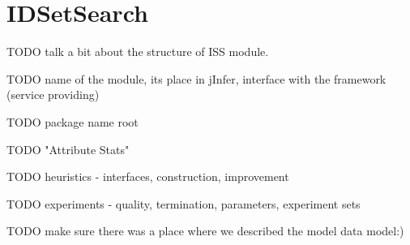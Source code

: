 \chapter{IDSetSearch}
\label{appendix-iss}

TODO talk a bit about the structure of ISS module.

TODO name of the module, its place in jInfer, interface with the framework (service providing)

TODO package name root

TODO "Attribute Stats"

TODO heuristics - interfaces, construction, improvement

TODO experiments - quality, termination, parameters, experiment sets

TODO make sure there was a place where we described the model data model:)